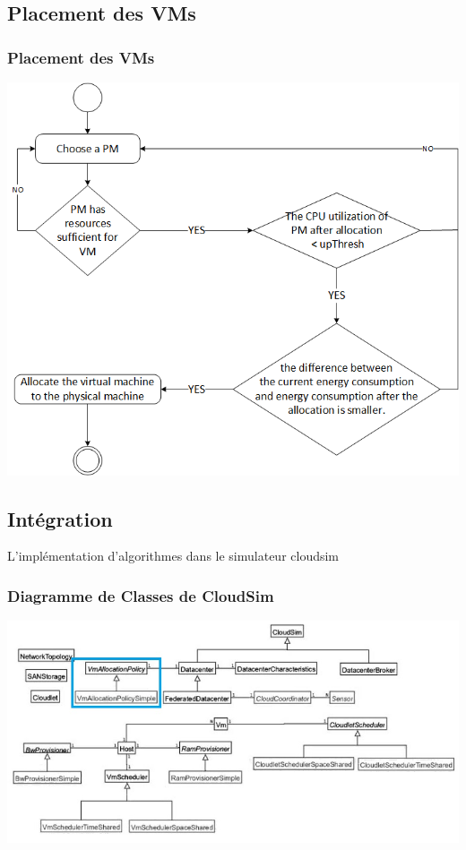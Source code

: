\documentclass[xcolor=dvipsnames]{beamer}
\begin{document}
\subsection{Placement des VMs}
\begin{frame}
\frametitle{Placement des VMs}
\begin{center}
\includegraphics[scale=0.42]{8.png}
\end{center}
\end{frame}

\subsection{Intégration}

\begin{frame}
\begin{block}{}
\begin{center}

\Huge L'implémentation d'algorithmes dans le simulateur cloudsim
\end{center}
\end{block}
\end{frame}

\begin{frame}
\frametitle{ Diagramme de Classes de CloudSim}
\begin{center}
\includegraphics[scale=0.48]{cloudsimclass.JPG}
\end{center}
\end{frame}
\end{document}
